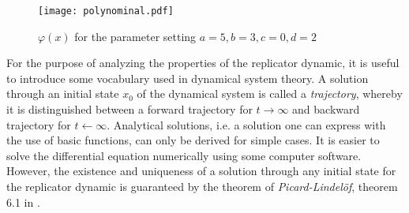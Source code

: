 \begin{figure}[h]
        \centering
        \texttt{[image: polynominal.pdf]}
        \caption[Polynominal of the Replicator Dynamic]{$\varphi(x)$ for the parameter setting $a=5, b=3, c=0, d=2$}
        \label{fig:polynominal}
\end{figure}
For the purpose of analyzing the properties of the replicator dynamic, it is 
useful to introduce some vocabulary used in dynamical system theory. 
A solution through an initial state $x_0$ of the dynamical system is called a 
\textit{trajectory}, whereby it is distinguished between a forward trajectory 
for $t \rightarrow \infty$ and backward trajectory for $t \leftarrow \infty$.
Analytical solutions, i.e. a solution one can express with the use of
basic functions, can only be derived for simple cases. 
It is easier to solve the differential equation numerically using some
computer software. 
However, the existence and uniqueness of a solution through
any initial state for the replicator dynamic is guaranteed by the theorem 
of \textit{Picard-Lindel\"of}, theorem 6.1 in 
\textcite[74]{weibull_evolutionary_1997}. 

